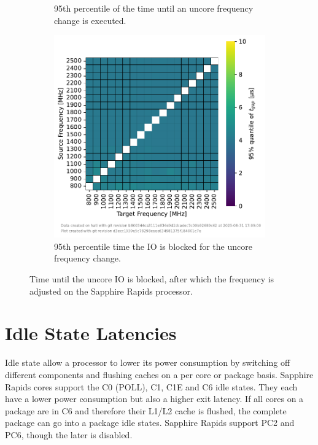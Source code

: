 \begin{figure}[]
\begin{subfigure}[t]{0.3\linewidth}
        \caption{\label{fig:ufs_init_95}95th percentile of the time until an uncore frequency change is executed.}
    \end{subfigure}
    \hfill
    \begin{subfigure}[t]{0.3\linewidth}
        \centering
        \includegraphics[width=\linewidth]{fig/uncore-frequency-switching-latency/95percentile-t-gap.pdf}
        \caption{\label{fig:ufs_gap_95}95th percentile time the IO is blocked for the uncore frequency change.}
    \end{subfigure}
    \caption{Time until the uncore IO is blocked, after which the frequency is adjusted on the Sapphire Rapids processor.}
\end{figure}

\section{Idle State Latencies}
\label{sec:idle_state_latencies}

Idle state allow a processor to lower its power consumption by switching off different components and flushing caches on a per core or package basis.
Sapphire Rapids cores support the C0 (POLL), C1, C1E and C6 idle states.
They each have a lower power consumption but also a higher exit latency.
If all cores on a package are in C6 and therefore their L1/L2 cache is flushed, the complete package can go into a package idle states.
Sapphire Rapids support PC2 and PC6, though the later is disabled.

